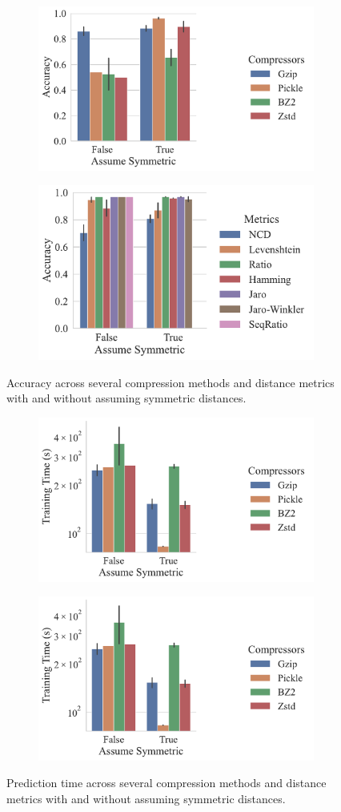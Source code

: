 \documentclass[sigconf]{acmart}
\begin{document}
\begin{figure}
    \begin{subfigure}
        \centering
        \includegraphics[width=.36\textwidth]{figs/truthseeker/symmetric_vs_compressor.pdf}
    \end{subfigure}
    \begin{subfigure}
        \centering
        \includegraphics[width=.36\textwidth]{figs/truthseeker/symmetric_vs_metric.pdf}
    \end{subfigure}
    \caption{Accuracy across several compression methods and distance metrics with and without assuming symmetric distances.}
    \label{fig:symmetry}
\end{figure}

\begin{figure}
    \begin{subfigure}
        \centering
        \includegraphics[width=.36\textwidth]{figs/truthseeker/symmetric_vs_compressor_train_time.pdf}
    \end{subfigure}
    \begin{subfigure}
        \centering
        \includegraphics[width=.36\textwidth]{figs/truthseeker/symmetric_vs_compressor_train_time.pdf}
    \end{subfigure}
    \caption{Prediction time across several compression methods and distance metrics with and without assuming symmetric distances.}
    \label{fig:symmetry_time}
\end{figure}
\end{document}
